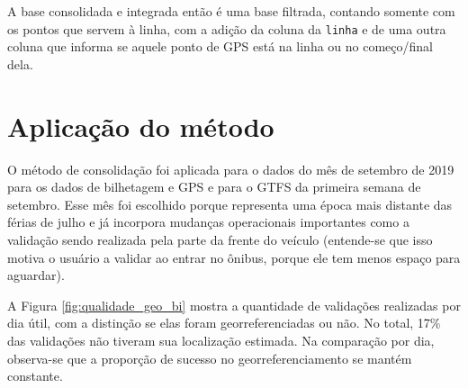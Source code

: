 \documentclass[        
    a4paper,          %
    12pt,             %
    chapter=TITLE,    %
    section=Title,    %
    subsection=Title, %
    oneside,          %
    english,          %
    spanish,          %
    brazil,           %
    fleqn             %
]{abntex2}
\let\oldtexttt\texttt
\renewcommand{\texttt}[1]{
  \colorbox{bgcolor}{\oldtexttt{#1}}
}
\begin{document}
  A base consolidada e integrada então é uma base filtrada, contando somente com os pontos que servem à linha, com a adição da coluna da \texttt{linha} e de uma outra coluna que informa se aquele ponto de GPS está na linha ou no começo/final dela.
  
  \hypertarget{aplicacao-do-metodo}{%
  \section{Aplicação do método}\label{aplicacao-do-metodo}}
  
  O método de consolidação foi aplicada para o dados do mês de setembro de 2019 para os dados de bilhetagem e GPS e para o GTFS da primeira semana de setembro. Esse mês foi escolhido porque representa uma época mais distante das férias de julho e já incorpora mudanças operacionais importantes como a validação sendo realizada pela parte da frente do veículo (entende-se que isso motiva o usuário a validar ao entrar no ônibus, porque ele tem menos espaço para aguardar).
  
  A Figura \ref{fig:qualidade_geo_bi} mostra a quantidade de validações realizadas por dia útil, com a distinção se elas foram georreferenciadas ou não. No total, 17\% das validações não tiveram sua localização estimada. Na comparação por dia, observa-se que a proporção de sucesso no georreferenciamento se mantém constante.
  
  \begin{figure}[!h]
  \captionsetup{width=16cm}
  \centering
  \end{figure}
  
\end{document}
